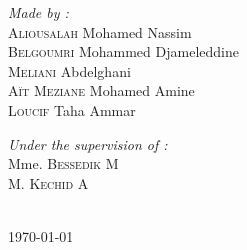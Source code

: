 {\begin{titlepage}
  \noindent
  \begin{minipage}{0.6\textwidth}
      \vspace{-7mm}
    \begin{flushleft} \large
      \emph{Made by :}\\
      \textsc{Aliousalah} Mohamed Nassim\\
      \textsc{Belgoumri} Mohammed Djameleddine\\
      \textsc{Meliani} Abdelghani\\
      \textsc{Aït Meziane} Mohamed Amine\\
      \textsc{Loucif} Taha Ammar\\
    \end{flushleft}
  \end{minipage}
  \begin{minipage}{0.3\textwidth}
    \begin{flushright} \large
      \begin{flushleft} \large
      \emph{Under the supervision of :} \\
      {
        \small
        Mme. \textsc{Bessedik} M\\[0.1cm]
        M. \textsc{Kechid} A\\[0.1cm]
      }
      \end{flushleft}

    \end{flushright}
  \end{minipage}\\[1cm]


  \vspace{20mm}
  {\large \today}        
  \end{titlepage}
  \restoregeometry
}